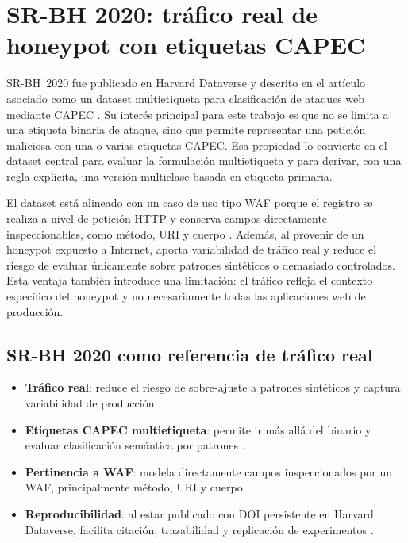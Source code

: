\documentclass[12pt,oneside]{report}
\begin{document}
\section{SR-BH 2020: tráfico real de honeypot con etiquetas CAPEC}
SR-BH~2020 fue publicado en Harvard Dataverse y descrito en el artículo asociado como un dataset multietiqueta para clasificación de ataques web mediante CAPEC \cite{srbh_dataverse,srbh_paper}. Su interés principal para este trabajo es que no se limita a una etiqueta binaria de ataque, sino que permite representar una petición maliciosa con una o varias etiquetas CAPEC. Esa propiedad lo convierte en el dataset central para evaluar la formulación multietiqueta y para derivar, con una regla explícita, una versión multiclase basada en etiqueta primaria.

El dataset está alineado con un caso de uso tipo WAF porque el registro se realiza a nivel de petición HTTP y conserva campos directamente inspeccionables, como método, URI y cuerpo \cite{srbh_paper,owasp_waf}. Además, al provenir de un honeypot expuesto a Internet, aporta variabilidad de tráfico real y reduce el riesgo de evaluar únicamente sobre patrones sintéticos o demasiado controlados. Esta ventaja también introduce una limitación: el tráfico refleja el contexto específico del honeypot y no necesariamente todas las aplicaciones web de producción.

\subsection{SR-BH 2020 como referencia de tráfico real}
\begin{itemize}[leftmargin=*]
  \item \textbf{Tráfico real}: reduce el riesgo de sobre-ajuste a patrones sintéticos y captura variabilidad de producción \cite{srbh_paper}.
  \item \textbf{Etiquetas CAPEC multietiqueta}: permite ir más allá del binario y evaluar clasificación semántica por patrones \cite{srbh_paper,capec_about}.
  \item \textbf{Pertinencia a WAF}: modela directamente campos inspeccionados por un WAF, principalmente método, URI y cuerpo \cite{owasp_waf,modsecurity_site}.
  \item \textbf{Reproducibilidad}: al estar publicado con DOI persistente en Harvard Dataverse, facilita citación, trazabilidad y replicación de experimentos \cite{srbh_dataverse}.
\end{itemize}
\end{document}
